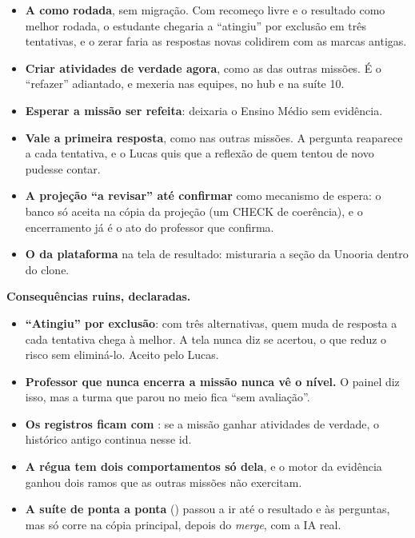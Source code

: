 \begin{itemize}
  \item \textbf{A  como rodada}, sem migração. Com recomeço livre e
    o resultado como melhor rodada, o estudante chegaria a \enquote{atingiu} por
    exclusão em três tentativas, e o zerar faria as respostas novas colidirem
    com as marcas antigas.
  \item \textbf{Criar atividades de verdade agora}, como as das outras
    missões. É o \enquote{refazer} adiantado, e mexeria nas equipes, no hub e na
    suíte 10.
  \item \textbf{Esperar a missão ser refeita}: deixaria o Ensino Médio sem
    evidência.
  \item \textbf{Vale a primeira resposta}, como nas outras missões. A pergunta
    reaparece a cada tentativa, e o Lucas quis que a reflexão de quem tentou de
    novo pudesse contar.
  \item \textbf{A projeção \enquote{a revisar} até confirmar} como mecanismo de
    espera: o banco só aceita  na cópia da projeção (um CHECK de
    coerência), e o encerramento já é o ato do professor que confirma.
  \item \textbf{O  da plataforma} na tela de resultado: misturaria
    a seção da Unooria dentro do clone.
\end{itemize}

\textbf{Consequências ruins, declaradas.}

\begin{itemize}
  \item \textbf{\enquote{Atingiu} por exclusão}: com três alternativas, quem muda
    de resposta a cada tentativa chega à melhor. A tela nunca diz se acertou, o
    que reduz o risco sem eliminá-lo. Aceito pelo Lucas.
  \item \textbf{Professor que nunca encerra a missão nunca vê o nível.} O painel
    diz isso, mas a turma que parou no meio fica \enquote{sem avaliação}.
  \item \textbf{Os registros ficam com }: se a missão
    ganhar atividades de verdade, o histórico antigo continua nesse id.
  \item \textbf{A régua tem dois comportamentos só dela}, e o motor da evidência
    ganhou dois ramos que as outras missões não exercitam.
  \item \textbf{A suíte de ponta a ponta} () passou a ir até o
    resultado e às perguntas, mas só corre na cópia principal, depois do
    \emph{merge}, com a IA real.
\end{itemize}

